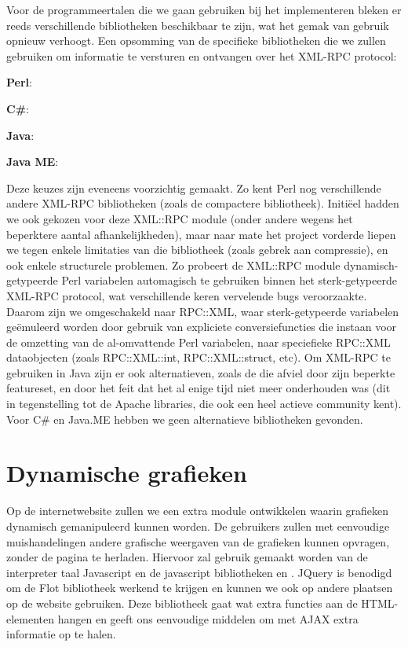 Voor de programmeertalen die we gaan gebruiken bij het implementeren bleken er reeds verschillende bibliotheken beschikbaar te zijn, wat het gemak van gebruik opnieuw verhoogt. Een opsomming van de specifieke bibliotheken die we zullen gebruiken om informatie te versturen en ontvangen over het XML-RPC protocol:
\begin{itemize_compact}
\item{\textbf{Perl}: }
\item{\textbf{C\#}: }
\item{\textbf{Java}: }
\item{\textbf{Java ME}: }
\end{itemize_compact}

Deze keuzes zijn eveneens voorzichtig gemaakt. Zo kent Perl nog verschillende andere XML-RPC bibliotheken (zoals de compactere  bibliotheek). Initi\"eel hadden we ook gekozen voor deze XML::RPC module (onder andere wegens het beperktere aantal afhankelijkheden), maar naar mate het project vorderde liepen we tegen enkele limitaties van die bibliotheek (zoals gebrek aan compressie), en ook enkele structurele problemen. Zo probeert de XML::RPC module dynamisch-getypeerde Perl variabelen automagisch te gebruiken binnen het sterk-getypeerde XML-RPC protocol, wat verschillende keren vervelende bugs veroorzaakte. Daarom zijn we omgeschakeld naar RPC::XML, waar sterk-getypeerde variabelen ge\"emuleerd worden door gebruik van expliciete conversiefuncties die instaan voor de omzetting van de al-omvattende Perl variabelen, naar speciefieke RPC::XML dataobjecten (zoals RPC::XML::int, RPC::XML::struct, etc).
Om XML-RPC te gebruiken in Java zijn er ook alternatieven, zoals de  die afviel door zijn beperkte featureset, en door het feit dat het al enige tijd niet meer onderhouden was (dit in tegenstelling tot de Apache libraries, die ook een heel actieve community kent).
Voor C\# en Java.ME hebben we geen alternatieve bibliotheken gevonden.

\section{Dynamische grafieken}

Op de internetwebsite zullen we een extra module ontwikkelen waarin grafieken dynamisch gemanipuleerd kunnen worden. De gebruikers zullen met eenvoudige muishandelingen andere grafische weergaven van de grafieken kunnen opvragen, zonder de pagina te herladen. Hiervoor zal gebruik gemaakt worden van de interpreter taal Javascript en de javascript bibliotheken  en . JQuery is benodigd om de Flot bibliotheek werkend te krijgen en kunnen we ook op andere plaatsen op de website gebruiken. Deze bibliotheek gaat wat extra functies aan de HTML-elementen hangen en geeft ons eenvoudige middelen om met AJAX extra informatie op te halen.

